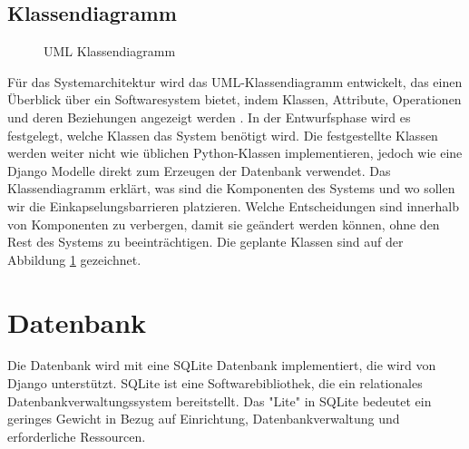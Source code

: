 \subsection{Klassendiagramm}
\label{sec:design:uml:class}
\begin{figure}
	\centering
	\caption{UML Klassendiagramm}
	\label{fig:class}
\end{figure}
Für das Systemarchitektur wird das UML-Klassendiagramm entwickelt, das einen Überblick über ein Softwaresystem bietet, indem Klassen, Attribute, Operationen und deren Beziehungen angezeigt werden \cite{website:19}. In der Entwurfsphase wird es festgelegt, welche Klassen das System benötigt wird. Die festgestellte Klassen werden weiter nicht wie üblichen Python-Klassen implementieren, jedoch wie eine Django Modelle direkt zum Erzeugen der Datenbank verwendet. Das Klassendiagramm erklärt, was sind die Komponenten des Systems und wo sollen wir die Einkapselungsbarrieren platzieren. Welche Entscheidungen sind innerhalb von Komponenten zu verbergen, damit sie geändert werden können, ohne den Rest des Systems zu beeinträchtigen. Die geplante Klassen sind auf der Abbildung \ref{fig:class} gezeichnet.


\section{Datenbank}
\label{sec:design:db}
Die Datenbank wird mit eine SQLite Datenbank implementiert, die wird von Django unterstützt. SQLite ist eine Softwarebibliothek, die ein relationales Datenbankverwaltungssystem bereitstellt. Das "Lite" in SQLite bedeutet ein geringes Gewicht in Bezug auf Einrichtung, Datenbankverwaltung und erforderliche Ressourcen. 
